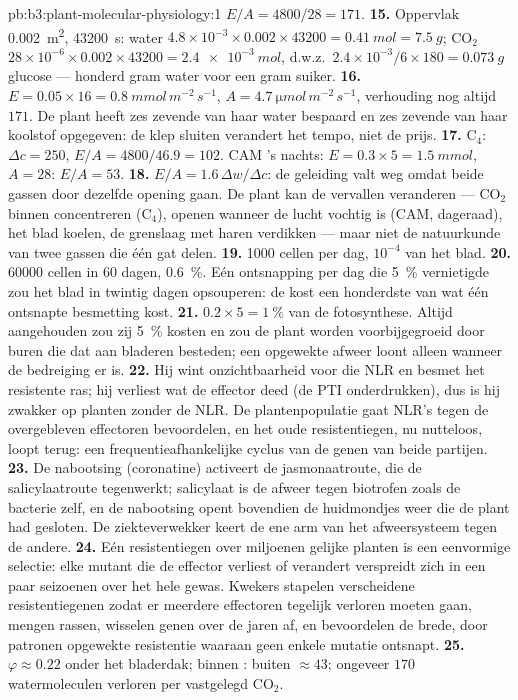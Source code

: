 \begin{solution}{pb:b3:plant-molecular-physiology:1}
$E/A = 4800/28 = 171$.
\textbf{15.} Oppervlak \qty{0.002}{m^2}, \num{43200}~s: water $4.8\times
10^{-3}\times 0.002\times\num{43200} = \qty{0.41}{mol} = \qty{7.5}{g}$;
CO$_{2}$ $28\times 10^{-6}\times 0.002\times\num{43200} =
\qty{2.4e-3}{mol}$, d.w.z.\ $2.4\times 10^{-3}/6\times 180 =
\qty{0.073}{g}$ glucose --- honderd gram water voor een gram suiker.
\textbf{16.} $E = 0.05\times 16 = \qty{0.8}{mmol\,m^{-2}\,s^{-1}}$,
$A = \qty{4.7}{\micro mol\,m^{-2}\,s^{-1}}$, verhouding nog altijd
$171$. De plant heeft zes zevende van haar water bespaard en zes
zevende van haar koolstof opgegeven: de klep sluiten verandert het
tempo, niet de prijs.
\textbf{17.} C$_{4}$: $\Delta c = 250$, $E/A = 4800/46.9 = 102$. CAM
's nachts: $E = 0.3\times 5 = \qty{1.5}{mmol}$, $A = 28$: $E/A = 53$.
\textbf{18.} $E/A = 1.6\,\Delta w/\Delta c$: de geleiding valt weg
omdat beide gassen door dezelfde opening gaan. De plant kan de
vervallen veranderen --- CO$_{2}$ binnen concentreren (C$_{4}$), openen
wanneer de lucht vochtig is (CAM, dageraad), het blad koelen, de
grenslaag met haren verdikken --- maar niet de natuurkunde van twee
gassen die één gat delen.
\textbf{19.} \num{1000} cellen per dag, $10^{-4}$ van het blad.
\textbf{20.} \num{60000} cellen in 60 dagen, \qty{0.6}{\%}. Eén ontsnapping
per dag die \qty{5}{\%} vernietigde zou het blad in twintig dagen
opsouperen: de  kost een honderdste van wat één
ontsnapte besmetting kost.
\textbf{21.} $0.2\times 5 = \qty{1}{\%}$ van de fotosynthese. Altijd
aangehouden zou zij \qty{5}{\%} kosten en zou de plant worden
voorbijgegroeid door buren die dat aan bladeren besteden; een opgewekte
afweer loont alleen wanneer de bedreiging er is.
\textbf{22.} Hij wint onzichtbaarheid voor die NLR en besmet het
resistente ras; hij verliest wat de effector deed (de PTI
onderdrukken), dus is hij zwakker op planten zonder de NLR. De
plantenpopulatie gaat NLR's tegen de overgebleven effectoren
bevoordelen, en het oude resistentiegen, nu nutteloos, loopt terug: een
frequentieafhankelijke cyclus van de genen van beide partijen.
\textbf{23.} De nabootsing (coronatine) activeert de jasmonaatroute,
die de salicylaatroute tegenwerkt; salicylaat is de afweer tegen
biotrofen zoals de bacterie zelf, en de nabootsing opent bovendien de
huidmondjes weer die de plant had gesloten. De ziekteverwekker keert de
ene arm van het afweersysteem tegen de andere.
\textbf{24.} Eén resistentiegen over miljoenen gelijke planten is een
eenvormige selectie: elke mutant die de effector verliest of verandert
verspreidt zich in een paar seizoenen over het hele gewas. Kwekers
stapelen verscheidene resistentiegenen zodat er meerdere effectoren
tegelijk verloren moeten gaan, mengen rassen, wisselen genen over de
jaren af, en bevoordelen de brede, door patronen opgewekte resistentie
waaraan geen enkele mutatie ontsnapt.
\textbf{25.} $\varphi \approx 0.22$ onder het bladerdak;  binnen :
buiten $\approx 43$; ongeveer $170$ watermoleculen verloren per
vastgelegd CO$_{2}$.
\end{solution}

